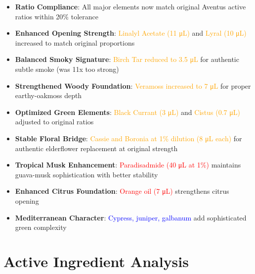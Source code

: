 \documentclass{article}
\begin{document}
\begin{itemize}
    \item \textbf{Ratio Compliance}: All major elements now match original Aventus active ratios within 20\% tolerance
    \item \textbf{Enhanced Opening Strength}: \textcolor{orange}{Linalyl Acetate (11 μL)} and \textcolor{orange}{Lyral (10 μL)} increased to match original proportions
    \item \textbf{Balanced Smoky Signature}: \textcolor{orange}{Birch Tar reduced to 3.5 μL} for authentic subtle smoke (was 11x too strong)
    \item \textbf{Strengthened Woody Foundation}: \textcolor{orange}{Veramoss increased to 7 μL} for proper earthy-oakmoss depth
    \item \textbf{Optimized Green Elements}: \textcolor{orange}{Black Currant (3 μL)} and \textcolor{orange}{Cistus (0.7 μL)} adjusted to original ratios
    \item \textbf{Stable Floral Bridge}: \textcolor{orange}{Cassie and Boronia at 1\% dilution (8 μL each)} for authentic elderflower replacement at original strength
    \item \textbf{Tropical Musk Enhancement}: \textcolor{red}{Paradisadmide (40 μL at 1\%)} maintains guava-musk sophistication with better stability
    \item \textbf{Enhanced Citrus Foundation}: \textcolor{red}{Orange oil (7 μL)} strengthens citrus opening
    \item \textbf{Mediterranean Character}: \textcolor{blue}{Cypress, juniper, galbanum} add sophisticated green complexity
\end{itemize}

\section{Active Ingredient Analysis}
\end{document}
